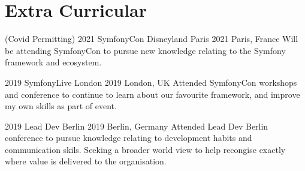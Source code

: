 \documentclass[]{friggeri-cv} %
\begin{document}

%
%
%
%
%
%
%


\section{Extra Curricular}

\begin{entrylist}


\entry
{(Covid Permitting) 2021}
{SymfonyCon Disneyland Paris 2021}
{Paris, France}
{Will be attending SymfonyCon to pursue new knowledge relating to the Symfony framework and ecosystem.}



\entry
{2019}
{SymfonyLive London 2019}
{London, UK}
{Attended SymfonyCon workshops and conference to continue to learn about our favourite framework, and improve my own skills as part of event.}


\entry
{2019}
{Lead Dev Berlin 2019}
{Berlin, Germany}
{Attended Lead Dev Berlin conference to pursue knowledge relating to development habits and communication skils.  Seeking a broader world view to help recongise exactly where value is delivered to the organisation.}


\end{entrylist}
\end{document}
